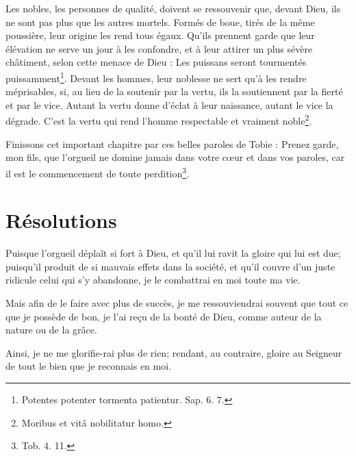 \documentclass[instructions.tex]{subfiles}
\begin{document}
Les nobles, les personnes de qualité, doivent se ressouvenir que, devant Dieu, ils ne sont pas plus que les autres mortels. Formés de boue, tirés de la même poussière, leur origine les rend tous égaux. Qu’ils prennent garde que leur élévation ne serve un jour à les confondre, et à leur attirer un plus sévère châtiment, selon cette menace de Dieu : Les puissans seront tourmentés puissamment\footnote{Potentes potenter tormenta patientur. Sap. 6. 7.}. Devant les hommes, leur noblesse ne sert qu’à les rendre méprisables, si, au lieu de la soutenir par la vertu, ils la soutiennent par la fierté et par le vice. Autant la vertu donne d’éclat à leur naissance, autant le vice la dégrade. C’est la vertu qui rend l’homme respectable et vraiment noble\footnote{Moribus et vitâ nobilitatur homo.}.
 
Finissons cet important chapitre par ces belles paroles de Tobie : Prenez garde, mon fils, que l’orgueil ne domine jamais dans votre cœur et dans vos paroles, car il est le commencement de toute perdition\footnote{Tob. 4. 11.}.
 
\section{Résolutions}
 
\primo Puisque l’orgueil déplaît si fort à Dieu, et qu’il lui ravit la gloire qui lui est due; puisqu’il produit de si mauvais effets dans la société, et qu’il couvre d’un juste ridicule celui qui s’y abandonne, je le combattrai en moi toute ma vie.
 
\secundo Mais afin de le faire avec plus de succès, je me ressouviendrai souvent que tout ce que je possède de bon, je l’ai reçu de la bonté de Dieu, comme auteur de la nature ou de la grâce.
 
\tertio Ainsi, je ne me glorifie-rai plus de rien; rendant, au contraire, gloire au Seigneur de tout le bien que je reconnais en moi. 

 
\end{document}
